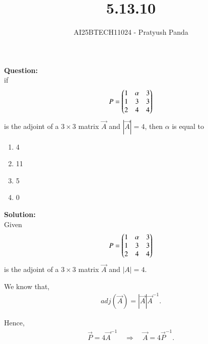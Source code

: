 \documentclass[journal]{IEEEtran}
\begin{document}

\vspace{3cm}

\title{5.13.10}
\author{AI25BTECH11024 - Pratyush Panda
}
\maketitle
{\let\newpage\relax\maketitle}

\renewcommand{\thefigure}{\theenumi}
\renewcommand{\thetable}{\theenumi}
\setlength{\intextsep}{10pt} %


\renewcommand{\thetable}{\theenumi}

\textbf{Question: } \\
if
\begin{align}
P = \begin{pmatrix}1 & \alpha & 3 \\ 1 & 3 & 3 \\ 2 & 4 & 4\end{pmatrix}
\end{align}
is the adjoint of a $3 \times 3$ matrix $\Vec{A}$ and $|\Vec{A}|=4$, then $\alpha$ is equal to
\begin{enumerate}
\item 4
\item 11
\item 5
\item 0
\end{enumerate}
\vspace{0.7cm}

\textbf{Solution: } \\
Given \\
\begin{align}
P = \begin{pmatrix}1 & \alpha & 3 \\ 1 & 3 & 3 \\ 2 & 4 & 4\end{pmatrix}
\end{align}
is the adjoint of a $3 \times 3$ matrix $\Vec{A}$ and $|A| = 4$.

We know that,
\begin{align}
adj(\Vec{A}) = |\Vec{A}| \Vec{A}^{-1}.
\end{align}

Hence,
\begin{align}
\Vec{P} = 4\Vec{A}^{-1} \quad \Rightarrow \quad \Vec{A} = 4\Vec{P}^{-1}.
\end{align}
\end{document}
